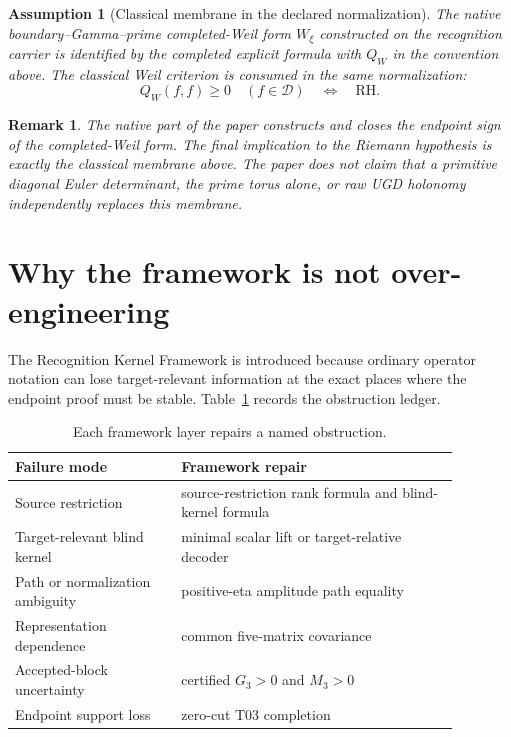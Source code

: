 \documentclass[11pt]{article}
\newtheorem{assumption}[theorem]{Assumption}
\newtheorem{remark}[theorem]{Remark}
\newcommand{\DD}{\mathcal D}
\begin{document}
\begin{assumption}[Classical membrane in the declared normalization]
The native boundary--Gamma--prime completed-Weil form \(W_\xi\) constructed on the recognition carrier is identified by the completed explicit formula with \(Q_W\) in the convention above.  The classical Weil criterion is consumed in the same normalization:
\[
Q_W(f,f)\ge0\quad(f\in\DD)
\quad\Longleftrightarrow\quad
\mathrm{RH}.
\]
\end{assumption}

\begin{remark}
The native part of the paper constructs and closes the endpoint sign of the completed-Weil form.  The final implication to the Riemann hypothesis is exactly the classical membrane above.  The paper does not claim that a primitive diagonal Euler determinant, the prime torus alone, or raw UGD holonomy independently replaces this membrane.
\end{remark}

\section{Why the framework is not over-engineering}

The Recognition Kernel Framework is introduced because ordinary operator notation can lose target-relevant information at the exact places where the endpoint proof must be stable.  Table~\ref{tab:minimality} records the obstruction ledger.

\begin{table}[h]
\centering
\begin{tabular}{p{0.33\linewidth}p{0.55\linewidth}}
\toprule
Failure mode & Framework repair \\
\midrule
Source restriction & source-restriction rank formula and blind-kernel formula \\
Target-relevant blind kernel & minimal scalar lift or target-relative decoder \\
Path or normalization ambiguity & positive-eta amplitude path equality \\
Representation dependence & common five-matrix covariance \\
Accepted-block uncertainty & certified \(G_3>0\) and \(M_3>0\) \\
Endpoint support loss & zero-cut T03 completion \\
\bottomrule
\end{tabular}
\caption{Each framework layer repairs a named obstruction.}
\label{tab:minimality}
\end{table}
\end{document}
